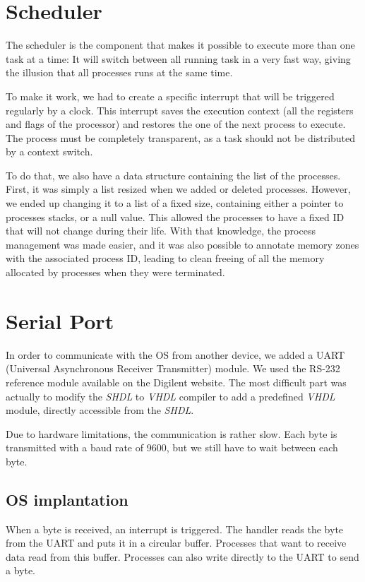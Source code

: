 \documentclass[openany, a4paper]{book}
\begin{document}
    \section{Scheduler}\label{sec:scheduler}
      The scheduler is the component that makes it possible to execute more than
      one task at a time: It will switch between all running task in a very fast
      way, giving the illusion that all processes runs at the same time.

      To make it work, we had to create a specific interrupt that will be
      triggered regularly by a clock. This interrupt saves the execution
      context (all the registers and flags of the processor) and restores the
      one of the next process to execute. The process must be completely
      transparent, as a task should not be distributed by a context switch.

      To do that, we also have a data structure containing the list of the
      processes. First, it was simply a list resized when we added or deleted
      processes. However, we ended up changing it to a list of a fixed size,
      containing either a pointer to processes stacks, or a null value.
      This allowed the processes to have a fixed ID that will not change during
      their life. With that knowledge, the process management was made
      easier, and it was also possible to annotate memory zones with the
      associated process ID, leading to clean freeing of all the memory
      allocated by processes when they were terminated.

    \section{Serial Port}
      In order to communicate with the OS from another device, we added a UART
      (Universal Asynchronous Receiver Transmitter) module. We used the RS-232
      reference module available on the Digilent website. The most difficult
      part was actually to modify the \emph{SHDL} to \emph{VHDL} compiler to add
      a predefined \emph{VHDL} module, directly accessible from the \emph{SHDL}.

      Due to hardware limitations, the communication is rather slow. Each byte
      is transmitted with a baud rate of 9600, but we still have to wait
      between each byte.

      \subsection{OS implantation}
        When a byte is received, an interrupt is triggered. The handler
        reads the byte from the UART and puts it in a circular buffer.
        Processes that want to receive data read from this buffer. Processes can
        also write directly to the UART to send a byte.
\end{document}
